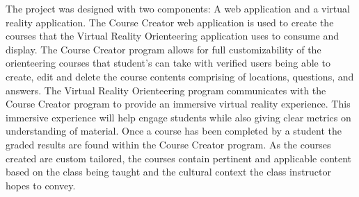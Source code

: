 The project was designed with two components: A web application and a virtual reality application. The Course Creator web application is used to create the courses that the Virtual Reality Orienteering application uses to consume and display. The Course Creator program allows for full customizability of the orienteering courses that student's can take with verified users being able to create, edit and delete the course contents comprising of locations, questions, and answers. The Virtual Reality Orienteering program communicates with the Course Creator program to provide an immersive virtual reality experience. This immersive experience will help engage students while also giving clear metrics on understanding of material. Once a course has been completed by a student the graded results are found within the Course Creator program. As the courses created are custom tailored, the courses contain pertinent and applicable content based on the class being taught and the cultural context the class instructor hopes to convey. 